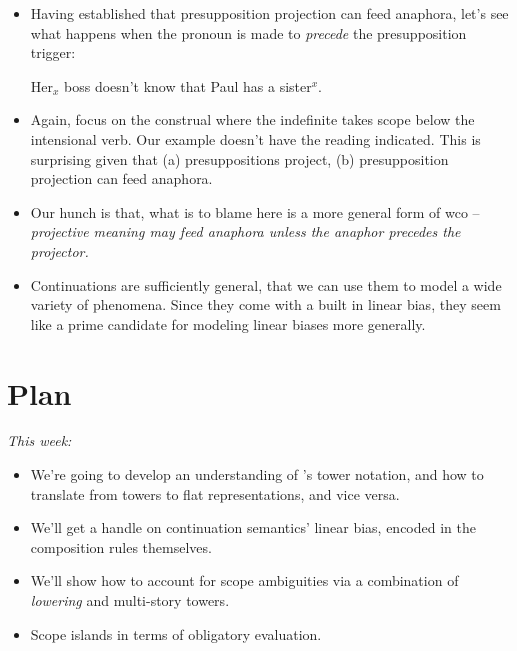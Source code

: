 \documentclass[nols,twoside,nofonts,nobib,nohyper]{tufte-handout}
\begin{document}
\begin{itemize}
    \item Having established that presupposition projection can feed anaphora,
    let's see what happens when the pronoun is made to \textit{precede} the
    presupposition trigger:

    \ex
    \ljudge{\#}Her$_{x}$ boss doesn't know that Paul has a sister$^{x}$.
    \xe

    \item Again, focus on the construal where the indefinite takes scope below
    the intensional verb. Our example doesn't have the reading indicated. This is surprising
    given that (a) presuppositions project, (b) presupposition projection can
    feed anaphora.

    \item Our hunch is that, what is to blame here is a more general form of \ac{wco}
    -- \textit{projective meaning may feed anaphora unless the anaphor precedes
    the projector.}

    \item Continuations are sufficiently general, that we can use them to model
    a wide variety of phenomena. Since they come with a built in linear
    bias, they
    seem like a prime candidate for modeling linear biases more generally.

\end{itemize}

\section{Plan}


\textit{This week:}

\begin{itemize}


    \item We're going to develop an understanding of \citeauthor{barkerShan2015}'s tower notation,
    and how to translate from towers to flat representations, and vice versa.

    \item We'll get a handle on continuation semantics' linear bias, encoded in the
    composition rules themselves.

    \item We'll show how to account for scope ambiguities via a combination of
    \textit{lowering} and multi-story towers.

    \item Scope islands in terms of obligatory evaluation.

\end{itemize}
\end{document}
